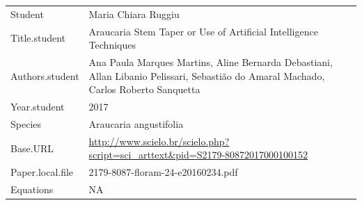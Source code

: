 \documentclass[]{article}
\begin{document}
\begin{longtable}[]{@{}ll@{}}
\toprule
\endhead
\begin{minipage}[t]{0.21\columnwidth}\raggedright
Student\strut
\end{minipage} & \begin{minipage}[t]{0.73\columnwidth}\raggedright
Maria Chiara Ruggiu\strut
\end{minipage}\tabularnewline
\begin{minipage}[t]{0.21\columnwidth}\raggedright
Title.student\strut
\end{minipage} & \begin{minipage}[t]{0.73\columnwidth}\raggedright
Araucaria Stem Taper or Use of Artificial Intelligence Techniques\strut
\end{minipage}\tabularnewline
\begin{minipage}[t]{0.21\columnwidth}\raggedright
Authors.student\strut
\end{minipage} & \begin{minipage}[t]{0.73\columnwidth}\raggedright
Ana Paula Marques Martins, Aline Bernarda Debastiani, Allan Libanio
Pelissari, Sebastião do Amaral Machado, Carlos Roberto Sanquetta\strut
\end{minipage}\tabularnewline
\begin{minipage}[t]{0.21\columnwidth}\raggedright
Year.student\strut
\end{minipage} & \begin{minipage}[t]{0.73\columnwidth}\raggedright
2017\strut
\end{minipage}\tabularnewline
\begin{minipage}[t]{0.21\columnwidth}\raggedright
Species\strut
\end{minipage} & \begin{minipage}[t]{0.73\columnwidth}\raggedright
Araucaria angustifolia\strut
\end{minipage}\tabularnewline
\begin{minipage}[t]{0.21\columnwidth}\raggedright
Base.URL\strut
\end{minipage} & \begin{minipage}[t]{0.73\columnwidth}\raggedright
\url{http://www.scielo.br/scielo.php?script=sci_arttext\&pid=S2179-80872017000100152}\strut
\end{minipage}\tabularnewline
\begin{minipage}[t]{0.21\columnwidth}\raggedright
Paper.local.file\strut
\end{minipage} & \begin{minipage}[t]{0.73\columnwidth}\raggedright
2179-8087-floram-24-e20160234.pdf\strut
\end{minipage}\tabularnewline
\begin{minipage}[t]{0.21\columnwidth}\raggedright
Equations\strut
\end{minipage} & \begin{minipage}[t]{0.73\columnwidth}\raggedright
NA\strut
\end{minipage}\tabularnewline
\bottomrule
\end{longtable}
\end{document}

